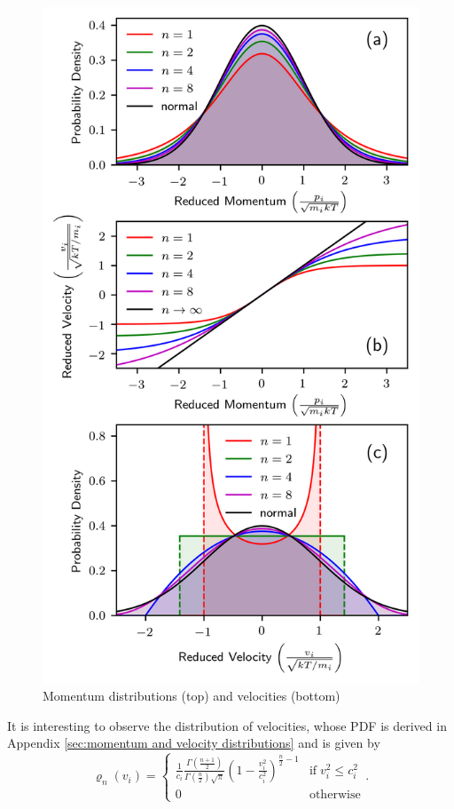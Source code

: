 \documentclass[
aip,
jcp,
reprint,
]{revtex4-1}
\newcommand{\nn}{n}
\begin{document}
\begin{figure}[htbp!]
	\centering
	\includegraphics[width=\linewidth]{momentum_and_velocity_functions}
	\caption{Momentum distributions (top) and velocities (bottom)}
	\label{fig:momentum and velocity functions}
\end{figure}

It is interesting to observe the distribution of velocities, whose PDF is derived in Appendix \ref{sec:momentum and velocity distributions} and is given by
\begin{equation*}
\varrho_\nn(v_i) = \begin{cases}
\frac{1}{c_i} \frac{\Gamma\left(\frac{\nn+1}{2}\right)}{\Gamma\left(\frac{\nn}{2}\right) \sqrt{\pi}} \left(1-\frac{v_i^2}{c_i^2}\right)^{\frac{\nn}{2}-1} & \mathrm{if} \; v_i^2 \leq c_i^2 \\
0 & \mathrm{otherwise}
\end{cases}.
\end{equation*}
\end{document}
